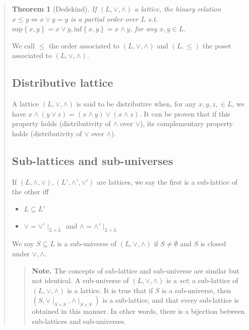 \documentclass[a4paper, 12pt]{article}
\newtheorem{theorem}{Theorem}
\newtheorem{theorem}{Theorem}
\begin{document}
\begin{quote}
\begin{theorem}[Dedekind]
    If $(L, \lor, \land)$ a lattice, the binary relation $x \leq y \iff x
    \lor y = y$ is a partial order over $L$ s.t. $\text{sup}\left\{ x, y
    \right\} = x \lor y, \text{inf}\left\{ x, y \right\} = x \land y$, for any
    $x, y \in L$.
\end{theorem}


We call $\leq$ the order associated to $(L, \lor, \land)$ and $(L, \leq)$ the
poset associated to $(L, \lor, \land)$.

\subsection{Distributive lattice}

A lattice $(L, \lor, \land)$ is said to be distributive when, for any $x, y, z,
\in L$, we have $x \land (y \lor z) = (x \land y) \lor (x \land z)$. It can be
proven that if this property holds (distributivity of $\land$ over $\lor$), its
complementary property holds (distributivity of $\lor$ over $\land$). 

\subsection{Sub-lattices and sub-universes}

If $(L, \land, \lor), (L', \land', \lor')$ are lattices, we say the first is a
sub-lattice of the other iff 

\begin{itemize}
    \item $L \subseteq L'$
    \item $\lor = \lor'\mid_{L \times L}$ and $\land = \land'\mid_{L \times L}$
\end{itemize}

We say $S \subseteq L$ is a sub-universe of $(L, \lor, \land)$ if $S \neq
\emptyset$ and $S$ is closed under $\lor, \land$.


\small
\begin{quote}

\textbf{Note.} The concepts of sub-lattice and sub-universe are similar but not
identical. A sub-universe of $(L, \lor, \land)$ is a \textit{set}; a sub-lattice
of $(L, \lor, \land)$ is a lattice. It is true that if $S$ is a sub-universe,
then $(S, \lor \mid_{S \times S}, \land \mid_{S \times S})$ is a sub-lattice,
and that every sub-lattice is obtained in this manner. In other words, there is
a bijection between sub-lattices and sub-universes. 



\end{quote}
\end{quote}
\end{document}
